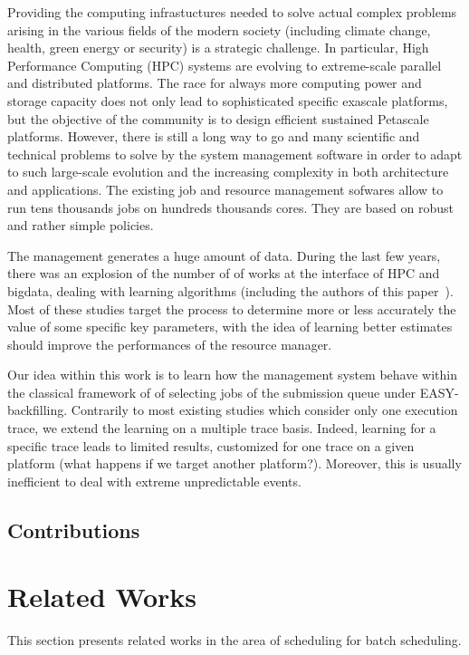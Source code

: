 \documentclass[sigconf]{acmart}
\begin{document}
Providing the computing infrastuctures needed to solve actual complex problems
arising in the various fields of the modern society (including climate change,
health, green energy or security) is a strategic challenge.
In particular, High Performance Computing (HPC) systems are evolving to
extreme-scale parallel and distributed platforms.
The race for always more computing power and storage capacity does not only
lead to sophisticated specific exascale platforms, but the objective of the
community is to design efficient sustained Petascale platforms.
However, there is still a long way to go and many scientific and technical
problems to solve by the system management software in order to adapt to such
large-scale evolution and the increasing complexity
in both architecture and applications.
The existing job and resource management sofwares allow to run tens thousands
jobs on hundreds thousands cores.
They are based on robust and rather simple policies.

\bigskip
The management generates a huge amount of data.
During the last few years, there was an explosion of the number of of works at
the interface of HPC and bigdata, dealing with learning algorithms
(including the authors of this paper~\cite{Gaussier2015ImprovingBB}).
Most of these studies target the process to determine more or less accurately
the value of some specific key parameters, with the idea of
learning better estimates should improve the performances of the resource
manager.

\bigskip
Our idea within this work is to learn how the management system behave within
the classical framework of of selecting jobs of the submission queue under
EASY-backfilling.
Contrarily to most existing studies which consider only one execution trace, we
extend the learning on a multiple trace basis.
Indeed, learning for a specific trace leads to limited results, customized for
one trace on a given platform (what happens if we target another platform?).
Moreover, this is usually inefficient to deal with extreme unpredictable
events.

\subsection{Contributions}

\section{Related Works}
\label{sec:rw}

This section presents related works in the area of scheduling for batch scheduling.
\end{document}
